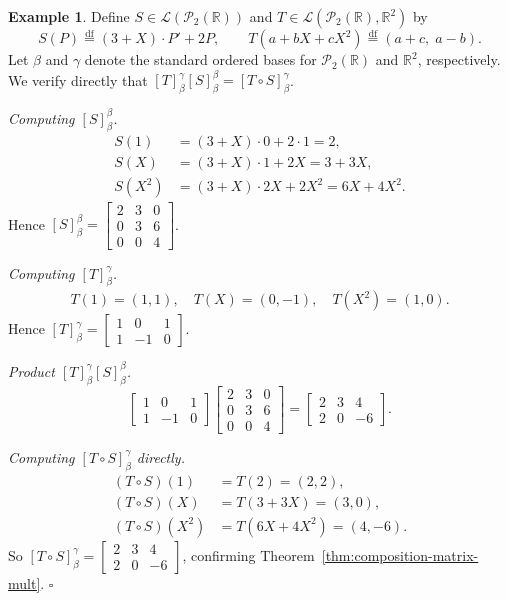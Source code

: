 \documentclass[11pt, a4paper, notitlepage]{report}
\theoremstyle{definition}
\newtheorem{example}[theorem]{Example}
\theoremstyle{remark}
\begin{document}
\begin{example}
\label{ex:composition-poly}
Define $S \in \mathcal{L}(\mathscr{P}_2(\mathbb{R}))$ and
$T \in \mathcal{L}(\mathscr{P}_2(\mathbb{R}), \mathbb{R}^2)$ by
\[
  S(P) \stackrel{\mathrm{df}}{=} (3+X)\cdot P' + 2P,
  \qquad
  T(a + bX + cX^2) \stackrel{\mathrm{df}}{=} (a+c,\; a-b).
\]
Let $\beta$ and $\gamma$ denote the standard ordered bases for $\mathscr{P}_2(\mathbb{R})$ and
$\mathbb{R}^2$, respectively.  We verify directly that
$[T]_\beta^\gamma [S]_\beta^\beta = [T \circ S]_\beta^\gamma$.

\emph{Computing $[S]_\beta^\beta$.}
\begin{align*}
  S(1)  &= (3+X)\cdot 0 + 2\cdot 1 = 2, \\
  S(X)  &= (3+X)\cdot 1 + 2X = 3 + 3X, \\
  S(X^2)&= (3+X)\cdot 2X + 2X^2 = 6X + 4X^2.
\end{align*}
Hence $[S]_\beta^\beta = \begin{bmatrix} 2 & 3 & 0 \\ 0 & 3 & 6 \\ 0 & 0 & 4 \end{bmatrix}$.

\emph{Computing $[T]_\beta^\gamma$.}
\begin{align*}
  T(1) = (1,1),\quad T(X) = (0,-1),\quad T(X^2) = (1,0).
\end{align*}
Hence $[T]_\beta^\gamma = \begin{bmatrix} 1 & 0 & 1 \\ 1 & -1 & 0 \end{bmatrix}$.

\emph{Product $[T]_\beta^\gamma [S]_\beta^\beta$.}
\[
  \begin{bmatrix} 1 & 0 & 1 \\ 1 & -1 & 0 \end{bmatrix}
  \begin{bmatrix} 2 & 3 & 0 \\ 0 & 3 & 6 \\ 0 & 0 & 4 \end{bmatrix}
  = \begin{bmatrix} 2 & 3 & 4 \\ 2 & 0 & -6 \end{bmatrix}.
\]

\emph{Computing $[T\circ S]_\beta^\gamma$ directly.}
\begin{align*}
  (T\circ S)(1)   &= T(2) = (2,2),\\
  (T\circ S)(X)   &= T(3+3X) = (3, 0),\\
  (T\circ S)(X^2) &= T(6X+4X^2) = (4,-6).
\end{align*}
So $[T\circ S]_\beta^\gamma = \begin{bmatrix} 2 & 3 & 4 \\ 2 & 0 & -6 \end{bmatrix}$,
confirming Theorem~\ref{thm:composition-matrix-mult}. $\square$
\end{example}
\end{document}
